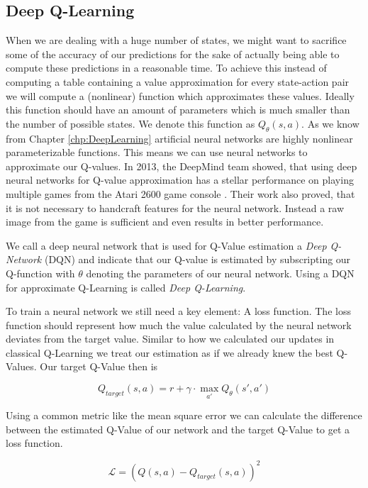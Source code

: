 \subsection{Deep Q-Learning} \label{ssec:DeepQLearning}
When we are dealing with a huge number of states, we might want to sacrifice some of the accuracy of our predictions for the sake of actually being able to compute these predictions in a reasonable time. To achieve this instead of computing a table containing a value approximation for every state-action pair we will compute a (nonlinear) function which approximates these values. Ideally this function should have an amount of parameters which is much smaller than the number of possible states. We denote this function as $Q_\theta(s, a)$. As we know from Chapter \ref{chp:DeepLearning} artificial neural networks are highly nonlinear parameterizable functions. This means we can use neural networks to approximate our Q-values. In 2013, the DeepMind team showed, that using deep neural networks for Q-value approximation has a stellar performance on playing multiple games from the Atari 2600 game console \cite{mnih2013playing}. Their work also proved, that it is not necessary to handcraft features for the neural network. Instead a raw image from the game is sufficient and even results in better performance.

We call a deep neural network that is used for Q-Value estimation a \textit{Deep Q-Network} (DQN) and indicate that our Q-value is estimated by subscripting our Q-function with $\theta$ denoting the parameters of our neural network. Using a DQN for approximate Q-Learning is called \textit{Deep Q-Learning}.

To train a neural network we still need a key element: A loss function. The loss function should represent how much the value calculated by the neural network deviates from the target value. Similar to how we calculated our updates in classical Q-Learning we treat our estimation as if we already knew the best Q-Values. Our target Q-Value then is 

\[Q_{target}(s, a) = r + \gamma \cdot \max_{a'}Q_\theta(s', a')\]

Using a common metric like the mean square error we can calculate the difference between the estimated Q-Value of our network and the target Q-Value to get a loss function.

\[\mathcal{L} = (Q(s, a) - Q_{target}(s, a))^2\]

